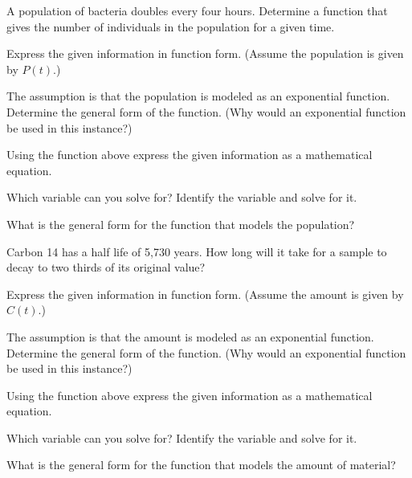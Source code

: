 \begin{problem}
\item A population of bacteria doubles every four hours. Determine a
  function that gives the number of individuals in the population for
  a given time.
  \begin{subproblem}
  \item Express the given information in function form. (Assume the
    population is given by $P(t)$.)
    \vfill
  \item The assumption is that the population is modeled as an
    exponential function. Determine the general form of the
    function. (Why would an exponential function be used in this
    instance?)
    \vfill
  \item Using the function above express the given information as a
    mathematical equation.
    \vfill
  \item Which variable can you solve for? Identify the variable and
    solve for it.
    \vfill
  \item What is the general form for the function that models the
    population?
    \vspace{1em}
  \end{subproblem}

\clearpage

\item Carbon 14 has a half life of 5,730 years. How long will it take
  for a sample to decay to two thirds of its original value?
  \begin{subproblem}
  \item Express the given information in function form. (Assume the
    amount is given by $C(t)$.)
    \vfill
  \item The assumption is that the amount is modeled as an
    exponential function. Determine the general form of the function. (Why
    would an exponential function be used in this instance?)
    \vfill
  \item Using the function above express the given information as a
    mathematical equation.
    \vfill
  \item Which variable can you solve for? Identify the variable and
    solve for it.
    \vfill
  \item What is the general form for the function that models the
    amount of material?
    \vspace{1em}
  \end{subproblem}

\clearpage



\end{problem}

